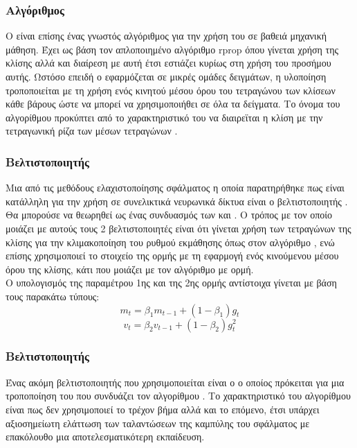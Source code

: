 \subsubsection{Αλγόριθμος }
Ο  είναι επίσης ένας γνωστός αλγόριθμος για την χρήση του σε βαθειά μηχανική μάθηση. Έχει ως βάση τον απλοποιημένο αλγόριθμο rprop όπου γίνεται χρήση της κλίσης αλλά και διαίρεση με αυτή έτσι εστιάζει κυρίως στη χρήση του προσήμου αυτής. Ωστόσο επειδή ο  εφαρμόζεται σε μικρές ομάδες δειγμάτων, η υλοποίηση τροποποιείται με τη χρήση ενός κινητού μέσου όρου του τετραγώνου των κλίσεων κάθε βάρους ώστε να μπορεί να χρησιμοποιήθει σε όλα τα δείγματα. Το όνομα του αλγορίθμου προκύπτει από το χαρακτηριστικό του να διαιρεϊται η κλίση με την τετραγωνική ρίζα των μέσων τετραγώνων .

\subsubsection{Βελτιστοποιητής }
Μια από τις μεθόδους ελαχιστοποίησης σφάλματος η οποία παρατηρήθηκε πως είναι κατάλληλη για την χρήση σε συνελικτικά νευρωνικά δίκτυα είναι ο βελτιστοποιητής . Θα μπορούσε να θεωρηθεί ως ένας συνδυασμός των  και . Ο τρόπος με τον οποίο μοιάζει με αυτούς τους 2 βελτιστοποιητές είναι ότι γίνεται χρήση των τετραγώνων της κλίσης για την κλιμακοποίηση του ρυθμού εκμάθησης όπως στον αλγόριθμο , ενώ επίσης χρησιμοποιεί το στοιχείο της ορμής με τη εφαρμογή ενός κινούμενου μέσου όρου της κλίσης, κάτι που μοιάζει με τον αλγόριθμο  με ορμή.\\

Ο υπολογισμός της παραμέτρου 1ης και της 2ης ορμής αντίστοιχα γίνεται με βάση τους παρακάτω τύπους:
$$m_t=\beta_1m_{t-1}+\left(1-\beta_1\right)g_t$$
$$v_t=\beta_2v_{t-1}+\left(1-\beta_2\right)g_t^2$$

\subsubsection{Βελτιστοποιητής }
Ένας ακόμη βελτιστοποιητής που χρησιμοποιείται είναι ο  ο οποίος πρόκειται για μια τροποποίηση του  που συνδυάζει τον αλγορίθμου . Το χαρακτηριστικό του αλγορίθμου  είναι πως δεν χρησιμοποιεί το τρέχον βήμα αλλά και το επόμενο, έτσι υπάρχει αξιοσημείωτη ελάττωση των ταλαντώσεων της καμπύλης του σφάλματος με επακόλουθο μια αποτελεσματικότερη εκπαίδευση.\\

